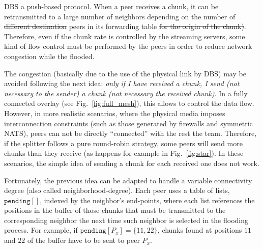 

\label{sec:chunk_flooding}

\begin{comment}
\begin{figure*}
  \imgw{300}{graphics/peer_chunk_flooding.svg}
  \caption{Chunk flooding at peers.\label{fig:peer_chunk_flooding}}
\end{figure*}
\end{comment}

DBS  a push-based protocol. When a peer receives a chunk, it
can be retransmitted to a large number of neighbors \leochange{(}{, }depending on the
number of \st{different destination} peers in its forwarding table \st{for the
origin of the chunk}\st{)}. Therefore, even if the chunk rate is controlled
by the streaming servers, some kind of flow control must be performed
by the peers in order to reduce network congestion while the  flooded.




The congestion (basically due to the use of the physical link by DBS) 
may be avoided following the next idea: \textit{only
  if I have received a chunk, I send (not necessary to the sender) a
  chunk (not necessary the received chunk)}. In a fully connected overlay (see Fig.~\ref{fig:full_mesh}), this
allows to control the data flow. However, in more realistic scenarios,
where the physical media imposes interconnection constraints (such as
those generated by firewalls and symmetric NATS), peers can not be
directly ``connected'' with the rest the team. Therefore, if the
splitter follows a pure round-robin strategy, some peers will send
more chunks than they receive  (as happens for example in
Fig.~\ref{fig:star}). In these scenarios, the simple idea of sending a
chunk for each received one does not work.

Fortunately, the previous idea can be adapted to handle a variable
connectivity degree (also called \gls{neighborhood-degree}).  Each
peer uses a table of lists, $\mathtt{pending}[]$, indexed by the
neighbor's end-points, where each list references the positions in the
buffer of those chunks  that must be transmitted to the corresponding
neighbor the next time such neighbor is selected in the flooding
process. For example, if $\mathtt{pending}[P_x]=\{11,22\}$, chunks
found at positions $11$ and $22$ of the buffer have to be sent to peer
$P_x$.

